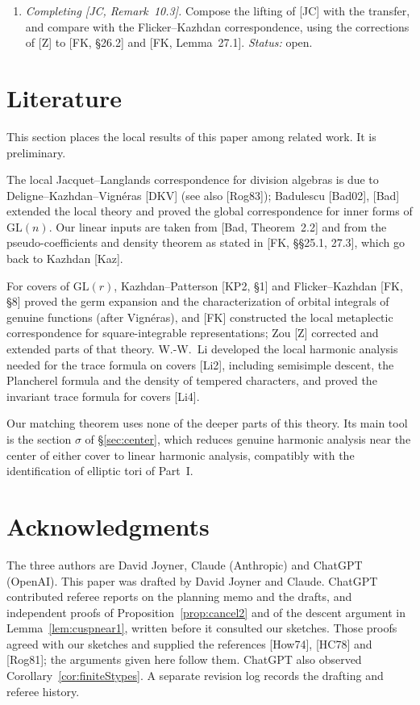 \documentclass[12pt]{article}
\newcommand{\GL}{\mathrm{GL}}
\newcommand{\sg}{\sigma}
\theoremstyle{plain}
\theoremstyle{definition}
\begin{document}
\begin{enumerate}[label=(\roman*),start=2]
\item \emph{Completing [JC, Remark~10.3].} Compose the lifting of [JC] with the transfer, and compare with the Flicker--Kazhdan correspondence, using the corrections of [Z] to [FK, \S26.2] and [FK, Lemma~27.1]. \emph{Status:} open.
\end{enumerate}

\section{Literature}\label{sec:lit}
This section places the local results of this paper among related work. It is preliminary.

The local Jacquet--Langlands correspondence for division algebras is due to Deligne--Kazhdan--Vign\'eras [DKV] (see also [Rog83]); Badulescu [Bad02], [Bad] extended the local theory and proved the global correspondence for inner forms of $\GL(n)$. Our linear inputs are taken from [Bad, Theorem~2.2] and from the pseudo-coefficients and density theorem as stated in [FK, \S\S25.1, 27.3], which go back to Kazhdan [Kaz].

For covers of $\GL(r)$, Kazhdan--Patterson [KP2, \S1] and Flicker--Kazhdan [FK, \S8] proved the germ expansion and the characterization of orbital integrals of genuine functions (after Vign\'eras), and [FK] constructed the local metaplectic correspondence for square-integrable representations; Zou [Z] corrected and extended parts of that theory. W.-W.~Li developed the local harmonic analysis needed for the trace formula on covers [Li2], including semisimple descent, the Plancherel formula and the density of tempered characters, and proved the invariant trace formula for covers [Li4].

Our matching theorem uses none of the deeper parts of this theory. Its main tool is the section $\sg$ of \S\ref{sec:center}, which reduces genuine harmonic analysis near the center of either cover to linear harmonic analysis, compatibly with the identification of elliptic tori of Part~I.

\section*{Acknowledgments}
The three authors are David Joyner, Claude (Anthropic) and ChatGPT (OpenAI). This paper was drafted by David Joyner and Claude. ChatGPT contributed referee reports on the planning memo and the drafts, and independent proofs of Proposition~\ref{prop:cancel2} and of the descent argument in Lemma~\ref{lem:cuspnear1}, written before it consulted our sketches. Those proofs agreed with our sketches and supplied the references [How74], [HC78] and [Rog81]; the arguments given here follow them. ChatGPT also observed Corollary~\ref{cor:finiteStypes}. A separate revision log records the drafting and referee history.
\end{document}
